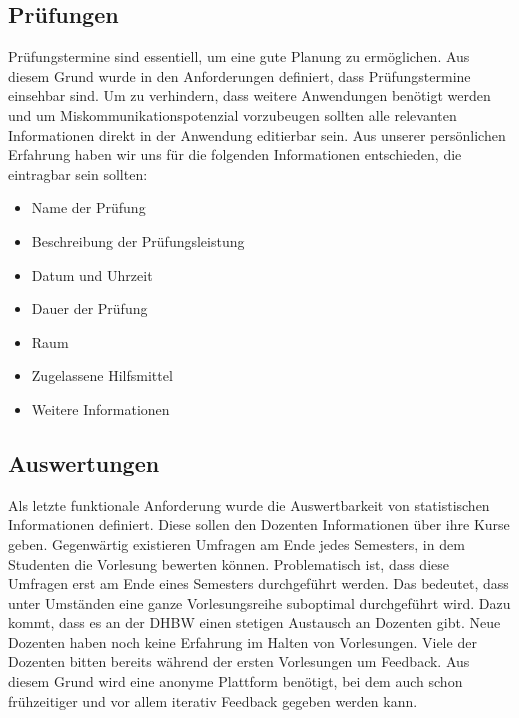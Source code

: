 \subsection{Prüfungen}
Prüfungstermine sind essentiell, um eine gute Planung zu ermöglichen.
Aus diesem Grund wurde in den Anforderungen definiert, dass Prüfungstermine einsehbar sind.
Um zu verhindern, dass weitere Anwendungen benötigt werden und um Miskommunikationspotenzial vorzubeugen sollten alle relevanten Informationen direkt in der Anwendung editierbar sein.
Aus unserer persönlichen Erfahrung haben wir uns für die folgenden Informationen entschieden, die eintragbar sein sollten:
\begin{itemize}
    \item Name der Prüfung
    \item Beschreibung der Prüfungsleistung
    \item Datum und Uhrzeit
    \item Dauer der Prüfung
    \item Raum
    \item Zugelassene Hilfsmittel
    \item Weitere Informationen
\end{itemize} 

\subsection{Auswertungen}
Als letzte funktionale Anforderung wurde die Auswertbarkeit von statistischen Informationen definiert.
Diese sollen den Dozenten Informationen über ihre Kurse geben.
Gegenwärtig existieren Umfragen am Ende jedes Semesters, in dem Studenten die Vorlesung bewerten können.
Problematisch ist, dass diese Umfragen erst am Ende eines Semesters durchgeführt werden.
Das bedeutet, dass unter Umständen eine ganze Vorlesungsreihe suboptimal durchgeführt wird.
Dazu kommt, dass es an der DHBW einen stetigen Austausch an Dozenten gibt.
Neue Dozenten haben noch keine Erfahrung im Halten von Vorlesungen.
Viele der Dozenten bitten bereits während der ersten Vorlesungen um Feedback.
Aus diesem Grund wird eine anonyme Plattform benötigt, bei dem auch schon frühzeitiger und vor allem iterativ Feedback gegeben werden kann.

